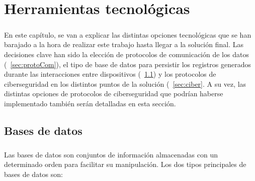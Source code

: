 %
%

\chapter{Herramientas tecnológicas}

\paragraph{}
En este capítulo, se van a explicar las distintas opciones tecnológicas que se han barajado a la hora de realizar este trabajo hasta llegar a la solución final. Las decisiones clave han sido la elección de protocolos de comunicación de los datos (~\ref{sec:protoCom}), el tipo de base de datos para persistir los registros generados durante las interacciones entre dispositivos (~\ref{sec:tipoBD}) y los protocolos de ciberseguridad en los distintos puntos de la solución (~\ref{sec:ciber}. A su vez, las distintas opciones de protocolos de ciberseguridad que podrían haberse implementado también serán detalladas en esta sección.



\section{Bases de datos}
\label{sec:tipoBD}
\paragraph{}
Las bases de datos son conjuntos de información almacenadas con un determinado orden para facilitar su manipulación. Los dos tipos principales de bases de datos son:

